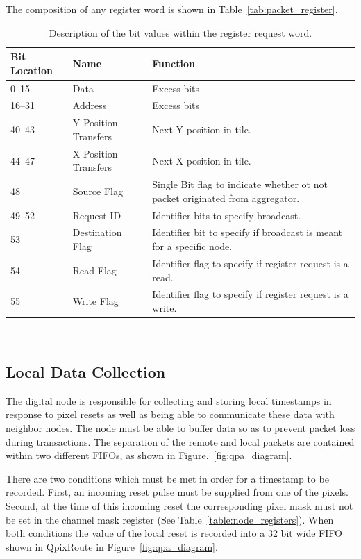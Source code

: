 The composition of any register word is shown in Table~\ref{tab:packet_register}.
\begin{table}
\begin{center}
\begin{tabular}{|| p{30mm} | p{30mm} | p{90mm} ||}
 \hline
 Bit Location & Name & Function \\ [0.5ex]
 \hline\hline
  0--15 & Data & Excess bits  \\
 \hline
  16--31 & Address & Excess bits  \\
 \hline
  40--43 & Y Position Transfers & Next Y position in tile. \\
 \hline
  44--47 & X Position Transfers & Next X position in tile. \\
 \hline
  48 & Source Flag & Single Bit flag to indicate whether ot not packet originated from aggregator. \\
 \hline
  49--52 & Request ID & Identifier bits to specify broadcast. \\
 \hline
  53 & Destination Flag & Identifier bit to specify if broadcast is meant for a specific node. \\
 \hline
  54 & Read Flag & Identifier flag to specify if register request is a read. \\
 \hline
  55 & Write Flag & Identifier flag to specify if register request is a write. \\
 \hline
\end{tabular}
\caption{Description of the bit values within the register request word.}
\end{center}
\end{table}
~\label{tab:packet_register}

\subsection{Local Data Collection}

The digital node is responsible for collecting and storing local timestamps in response to pixel resets as well as being able to communicate these data with neighbor nodes.
The node must be able to buffer data so as to prevent packet loss during transactions.
The separation of the remote and local packets are contained within two different FIFOs, as shown in Figure.~\ref{fig:qpa_diagram}.

There are two conditions which must be met in order for a timestamp to be recorded.
First, an incoming reset pulse must be supplied from one of the pixels.
Second, at the time of this incoming reset the corresponding pixel mask must not be set in the channel mask register (See Table~\ref{table:node_registers}).
When both conditions the value of the local reset is recorded into a 32 bit wide FIFO shown in QpixRoute in Figure~\ref{fig:qpa_diagram}.

